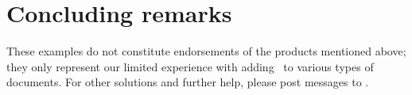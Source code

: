 \section{Concluding remarks}

These examples do not constitute endorsements of the products mentioned above; they only represent our limited experience with adding \PS\ to various types of documents.  For other solutions and further help, please post messages to
.
